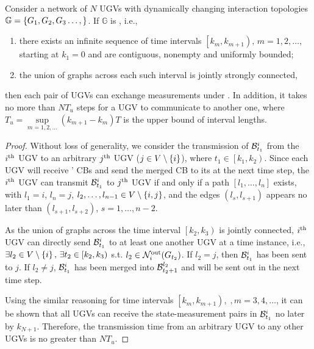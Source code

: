 	\begin{thm}\label{prop1}
		Consider a network of $N$ UGVs with dynamically changing interaction topologies \small$\mathbb{G}=\left\lbrace G_{1},G_{2},G_{3}\dots,\right\rbrace$\normalsize.
		If $\mathbb{G}$ is \fc, i.e.,
		\begin{enumerate}
			\item there exists an infinite sequence of time intervals $\left[k_m,k_{m+1} \right),\,m=1,2,\dots$, starting at $k_1=0$ and are contiguous, nonempty and uniformly bounded;
			\item the union of graphs across each such interval is jointly strongly connected,
		\end{enumerate}
		then each pair of UGVs can exchange measurements under \proto. 
		In addition, it takes no more than $NT_u$ steps for a UGV to communicate to another one, 
		where \small$T_u=\sup\limits_{m=1,2,\dots}\left( k_{m+1}-k_m\right) T$ \normalsize is the upper bound of interval lengths.
	\end{thm}
	
	\begin{proof}				
		Without loss of generality, we consider the transmission of $\mathcal{B}^i_{t_1}$ from the $i^\text{th}$ UGV to an arbitrary $j^\text{th}$ UGV ($j\in V\setminus \left\lbrace i\right\rbrace$), where $t_1\in\left[k_1,k_2 \right)$.
		Since each UGV will receive \inbhd' CBs and send the merged CB to its {\onbhd} at the next time step, the $i^\text{th}$ UGV can transmit $\mathcal{B}^i_{t_1}$ to $j^\text{th}$ UGV if and only if a path $\left[l_1,\dots,l_n\right]$ exists, with $l_1=i$, $l_n=j$, $l_2,\dots,l_{n-1}\in V\setminus\left\lbrace i,j\right\rbrace$, and the edges $(l_s,l_{s+1})$ appears no later than $(l_{s+1},l_{s+2})$, $s=1,\dots,n-2$.
		
		As the union of graphs across the time interval $\left[k_2,k_3 \right)$ is jointly connected, $i^\text{th}$ UGV can directly send $\mathcal{B}^i_{t_1}$ to at least one another UGV at a time instance, i.e., $\exists l_2\in V\setminus \left\lbrace i\right\rbrace,\, \exists t_2\in \left[k_2,k_3 \right)$ s.t. $l_2\in\mathcal{N}^\text{out}_{i}(G_{t_2})$.
		If $l_2=j$, then $\mathcal{B}^i_{t_1}$ has been sent to $j$.
		If $l_2\neq j$, $\mathcal{B}^i_{t_1}$ has been merged into $\mathcal{B}^{l_2}_{t_2+1}$ and will be sent out in the next time step. 
		
		Using the similar reasoning for time intervals $\left[k_m,k_{m+1} \right),\;,m=3,4,\dots$, it can be shown that all UGVs can receive the state-measurement pairs in $\mathcal{B}^i_{t_1}$ no later by $k_{N+1}$.
		Therefore, the transmission time from an arbitrary UGV to any other UGVs is no greater than \small$NT_u$\normalsize.
		
	\end{proof}
	
